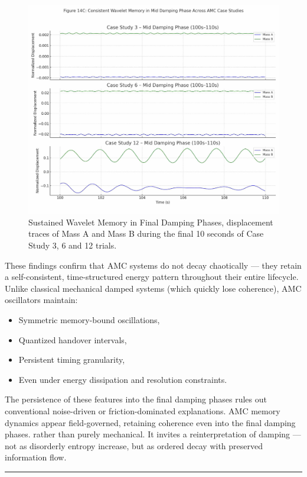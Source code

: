 \documentclass[10pt,aps,pre,onecolumn,superscriptaddress,notitlepage]{revtex4-2}
\begin{document}
\begin{figure}[htbp]
  \centering
  \includegraphics[width=0.8\linewidth]{figures/Figure_14C_Mid_Damping_Phase_All_Cases_Corrected.jpg}
  \caption{Sustained Wavelet Memory in Final Damping Phases, displacement traces of Mass A and Mass B during the final 10 seconds of Case Study 3, 6 and 12 trials.}
  \label{fig:midwave}
\end{figure}
These findings confirm that AMC systems do not decay chaotically — they retain a self-consistent, time-structured energy pattern throughout their entire lifecycle. Unlike classical mechanical damped systems (which quickly lose coherence), AMC oscillators maintain:
\begin{itemize}
    \item Symmetric memory-bound oscillations,
    \item Quantized handover intervals,
    \item Persistent timing granularity,
    \item Even under energy dissipation and resolution constraints.

\end{itemize}

The persistence of these features into the final damping phases rules out conventional noise-driven or friction-dominated explanations. AMC memory dynamics appear field-governed, retaining coherence even into the final damping phases. rather than purely mechanical. It invites a reinterpretation of damping — not as disorderly entropy increase, but as ordered decay with preserved information flow. 

\vspace{1em}
\hrule
\vspace{1.em}
\clearpage
\end{document}

